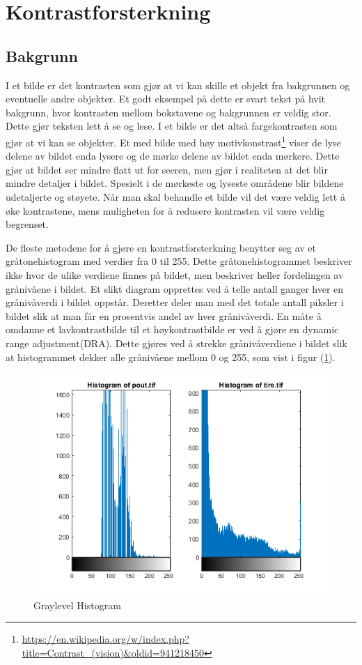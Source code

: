 \newpage
\section{Kontrastforsterkning}
\label{sec:Kontrastforsterkning}
\subsection{Bakgrunn}
I et bilde er det kontrasten som gjør at vi kan skille et objekt fra bakgrunnen og eventuelle andre objekter.\cite{wiki:kontrast} Et godt eksempel på dette er svart tekst på hvit bakgrunn, hvor kontrasten mellom bokstavene og bakgrunnen er veldig stor. Dette gjør teksten lett å se og lese. I et bilde er det altså fargekontrasten som gjør at vi kan se objekter. Et med bilde med høy motivkonstrast\footnote{\url{https://en.wikipedia.org/w/index.php?title=Contrast_(vision)&oldid=941218450}} viser de lyse delene av bildet enda lysere og de mørke delene av bildet enda mørkere. Dette gjør at bildet ser mindre flatt ut for seeren, men gjør i realiteten at det blir mindre detaljer i bildet. Spesielt i de mørkeste og lyseste områdene blir bildene udetaljerte og støyete. Når man skal behandle et bilde vil det være veldig lett å øke kontrastene, mens muligheten for å redusere kontrasten vil være veldig begrenset. 

De fleste metodene for å gjøre en kontrastforsterkning benytter seg av et gråtonehistogram med verdier fra 0 til 255. Dette gråtonehistogrammet beskriver ikke hvor de ulike verdiene finnes på bildet, men beskriver heller fordelingen av grånivåene i bildet. Et slikt diagram opprettes ved å telle antall ganger hver en grånivåverdi i bildet oppstår. Deretter deler man med det totale antall piksler i bildet slik at man får en prosentvis andel av hver grånivåverdi. En måte å omdanne et lavkontrastbilde til et høykontrastbilde er ved å gjøre en dynamic range adjustment(DRA)\cite{Contrast:Human}. Dette gjøres ved å strekke grånivåverdiene i bildet slik at histogrammet dekker alle grånivåene mellom 0 og 255, som vist i figur (\ref{Figur 2}).

\begin{figure}[H]
\begin{center}
    \includegraphics[width=0.7\columnwidth]{bilder/graylevelhistogram.png}
    \caption{Graylevel Histogram \label{Figur 2}} 
\end{center}
\end{figure}
\newpage
